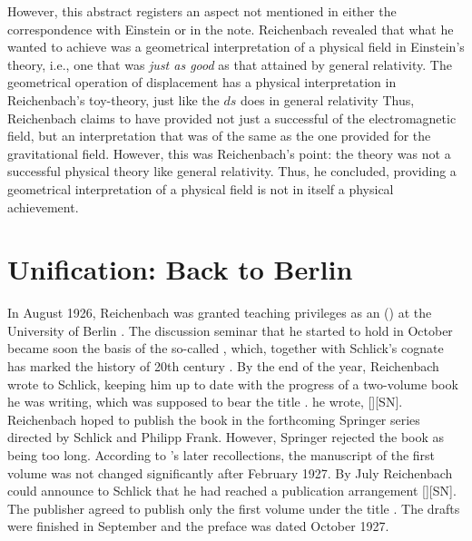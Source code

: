 \documentclass[draft]{article}
\begin{document}
However, this abstract registers an aspect not mentioned in either the correspondence with Einstein or in the note. Reichenbach revealed that what he wanted to achieve was a geometrical interpretation of a physical field  in Einstein's theory, i.e., one that was \emph{just as good} as that attained by general relativity. The geometrical operation of displacement has a physical interpretation in Reichenbach's toy-theory, just like the $d s$ does in general relativity Thus, Reichenbach claims to have provided not just a successful  of the electromagnetic field, but an interpretation that was of the same  as the one \gr provided for the gravitational field. However, this was Reichenbach's point: the theory was not a successful physical theory like general relativity. Thus, he concluded, providing a geometrical interpretation of a physical field is not in itself a physical achievement.




\section{Unification: Back to Berlin}

In August 1926, Reichenbach was granted teaching privileges as an  () at the University of Berlin \citep{Hecht1982}. The discussion seminar that he started to hold in October became soon the basis of the so-called , which, together with Schlick's cognate  has marked the history of 20th century  . By the end of the year, Reichenbach wrote to Schlick, keeping him up to date with the progress of a two-volume book he was writing, which was supposed to bear the title .  he wrote,  [][SN]\label{RZL1926}. Reichenbach hoped to publish the book in the forthcoming Springer series  directed by Schlick and Philipp Frank. However, Springer rejected the book as being too long. According to \Reich's later recollections, the manuscript of the first volume was not changed significantly after February 1927. By July Reichenbach could announce to Schlick that he had reached a publication arrangement [][SN]. The publisher agreed to publish only the first volume under the title . The drafts were finished in September and the preface was dated October 1927.
\end{document}

